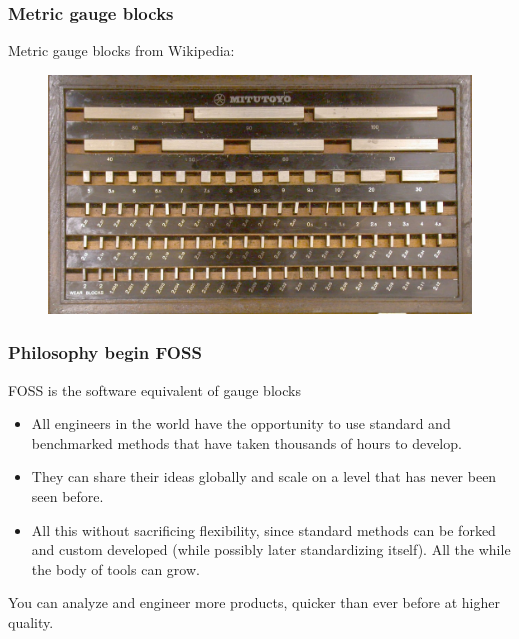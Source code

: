 \documentclass{beamer}
\begin{document}
\begin{frame}

\frametitle{Metric gauge blocks}

Metric gauge blocks from Wikipedia:
\begin{figure}
\includegraphics[width=0.8\linewidth]{Pictures/GaugeBlockMetricSet.jpg}
\end{figure}
\end{frame}




\begin{frame}
\frametitle{Philosophy begin FOSS}

\begin{center}
        FOSS is the software equivalent of gauge blocks
\end{center}

\begin{itemize}
\item All engineers in the world have the opportunity to use standard and benchmarked methods that have taken thousands of hours to develop.
\item They can share their ideas globally and scale on a level that has never been seen before.
\item All this without sacrificing flexibility, since standard methods can be forked and custom developed (while possibly later standardizing itself).  All the while the body of tools can grow.
\end{itemize}

\begin{center}
        You can analyze and engineer more products, quicker than ever before at higher quality.
\end{center}

\end{frame}
\end{document}
